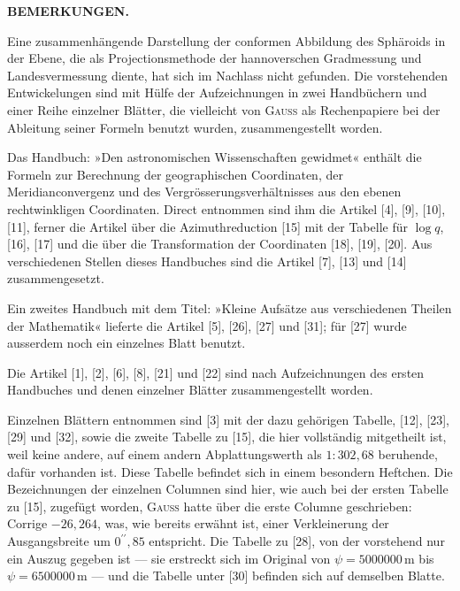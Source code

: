 \thispagestyle{empty}
\vspace*{1.6\baselineskip}
\begin{center}\large\textbf{BEMERKUNGEN.}\end{center}
{\small
Eine zusammenhängende Darstellung der conformen Abbildung des Sphäroids in der Ebene,
die als Projectionsmethode der hannoverschen Gradmessung und Landesvermessung diente,
hat sich im Nachlass nicht gefunden. Die vorstehenden Entwickelungen sind mit Hülfe der
Aufzeichnungen in zwei Handbüchern und einer Reihe einzelner Blätter, die vielleicht von
\textsc{Gauss} als Rechenpapiere bei der Ableitung seiner Formeln benutzt wurden,
zusammengestellt worden.

Das Handbuch: »Den astronomischen Wissenschaften gewidmet« enthält die Formeln zur
Berechnung der geographischen Coordinaten, der Meridianconvergenz und des
Vergrösserungsverhältnisses aus den ebenen rechtwinkligen Coordinaten. Direct entnommen
sind ihm die Artikel [4], [9], [10], [11], ferner die Artikel über die Azimuthreduction [15]
mit der Tabelle für \(\log q\), [16], [17] und die über die Transformation der Coordinaten
[18], [19], [20]. Aus verschiedenen Stellen dieses Handbuches sind die Artikel [7], [13]
und [14] zusammengesetzt.

Ein zweites Handbuch mit dem Titel: »Kleine Aufsätze aus verschiedenen Theilen der
Mathematik« lieferte die Artikel [5], [26], [27] und [31]; für [27] wurde ausserdem noch
ein einzelnes Blatt benutzt.

Die Artikel [1], [2], [6], [8], [21] und [22] sind nach Aufzeichnungen des ersten
Handbuches und denen einzelner Blätter zusammengestellt worden.

Einzelnen Blättern entnommen sind [3] mit der dazu gehörigen Tabelle, [12], [23], [29]
und [32], sowie die zweite Tabelle zu [15], die hier vollständig mitgetheilt ist, weil keine
andere, auf einem andern Abplattungswerth als \(1:302{,}68\) beruhende, dafür vorhanden ist.
Diese Tabelle befindet sich in einem besondern Heftchen. Die Bezeichnungen der einzelnen
Columnen sind hier, wie auch bei der ersten Tabelle zu [15], zugefügt worden,
\textsc{Gauss} hatte über die erste Columne geschrieben: Corrige \(-26{,}264\), was,
wie bereits erwähnt ist, einer Verkleinerung der Ausgangsbreite um \(0^{\prime\prime}{,}85\)
entspricht. Die Tabelle zu [28], von der vorstehend nur ein Auszug gegeben ist --- sie
erstreckt sich im Original von \(\psi=5000000\,\mathrm m\) bis \(\psi=6500000\,\mathrm m\) ---
und die Tabelle unter [30] befinden sich auf demselben Blatte.

}
